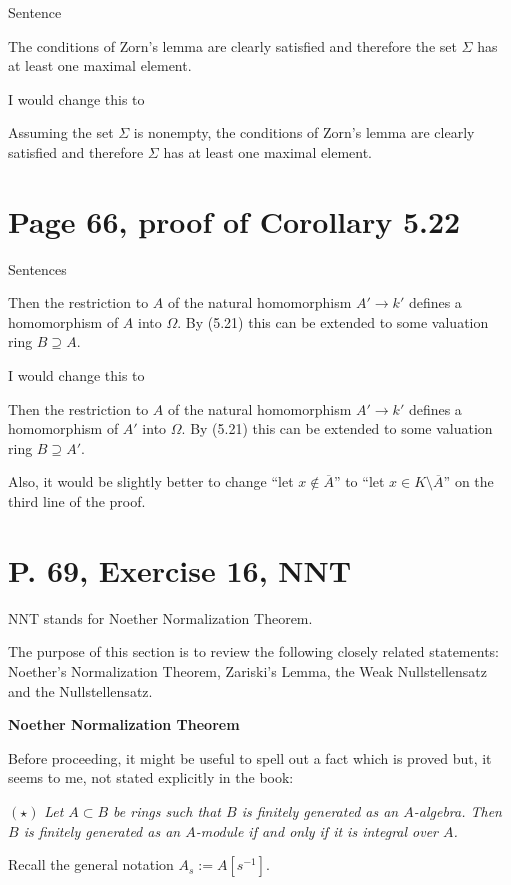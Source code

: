 \documentclass[parskip=half]{scrartcl}%
\begin{document}
Sentence

The conditions of Zorn's lemma are clearly satisfied and therefore the set $\Sigma$ has at least one maximal element.

I would change this to 

Assuming the set $\Sigma$ is nonempty, the conditions of Zorn's lemma are clearly satisfied and therefore $\Sigma$ has at least one maximal element.

\section{Page 66, proof of Corollary 5.22}%

Sentences

Then the restriction to $A$ of the natural homomorphism $A'\to k'$ defines a homomorphism of $A$ into $\Omega$. By (5.21) this can be extended to some valuation ring $B\supseteq A$.

I would change this to 

Then the restriction to $A$ of the natural homomorphism $A'\to k'$ defines a homomorphism of $A'$ into $\Omega$. By (5.21) this can be extended to some valuation ring $B\supseteq A'$.

Also, it would be slightly better to change ``let $x\notin\overline A$'' to ``let $x\in K\setminus\overline A$'' on the third line of the proof.\bigskip

\section{P. 69, Exercise 16, NNT}\label{nnt}%

NNT stands for Noether Normalization Theorem.

The purpose of this section is to review the following closely related statements: Noether's Normalization Theorem, Zariski's Lemma, the Weak Nullstellensatz and the Nullstellensatz.

\textbf{\Large Noether Normalization Theorem}

Before proceeding, it might be useful to spell out a fact which is proved but, it seems to me, not stated explicitly in the book:

$(\star)$ \emph{Let $A\subset B$ be rings such that $B$ is finitely generated as an $A$-algebra. Then $B$ is finitely generated as an $A$-module if and only if it is integral over $A$.}

Recall the general notation $A_s:=A[s^{-1}]$.%
\end{document}
